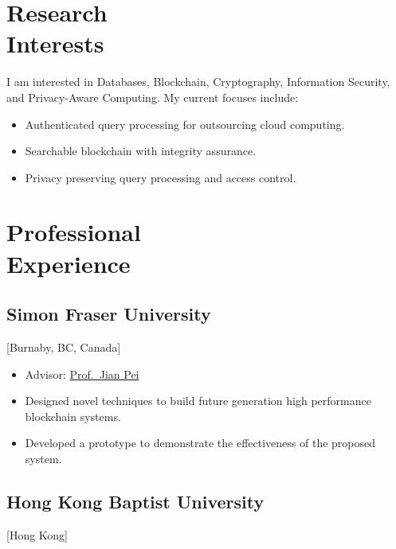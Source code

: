 \documentclass{mycv}
\begin{document}
\maketitle%

\section{Research \\ Interests}

I am interested in Databases, Blockchain, Cryptography, Information Security, and Privacy-Aware Computing. My current focuses include:

\begin{itemize}
  \item Authenticated query processing for outsourcing cloud computing.
  \item Searchable blockchain with integrity assurance.
  \item Privacy preserving query processing and access control.
\end{itemize}

\section{Professional \\ Experience}

\subsection{Simon Fraser University}[Burnaby, BC, Canada]
\begin{positions}
\end{positions}

\begin{itemize}
  \item Advisor: \href{https://www.cs.sfu.ca/~jpei/}{Prof.~Jian Pei}
  \item Designed novel techniques to build future generation high performance blockchain systems.
  \item Developed a prototype to demonstrate the effectiveness of the proposed system.
\end{itemize}

\subsection{Hong Kong Baptist University}[Hong Kong]
\begin{positions}
\end{positions}
\end{document}
